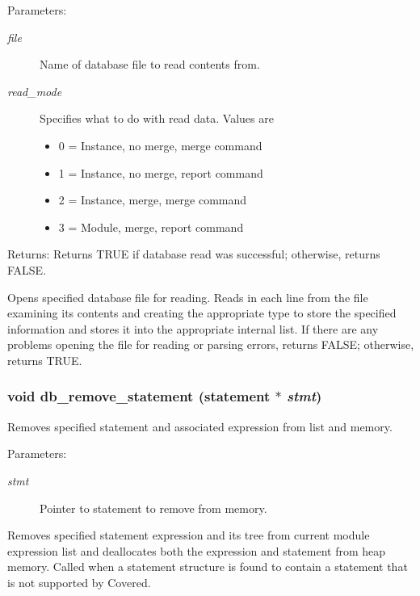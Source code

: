 \begin{Desc}
\item[Parameters:]
\begin{description}
\item[{\em file}]Name of database file to read contents from. \item[{\em read\_\-mode}]Specifies what to do with read data. Values are\begin{itemize}
\item 0 = Instance, no merge, merge command\item 1 = Instance, no merge, report command\item 2 = Instance, merge, merge command\item 3 = Module, merge, report command\end{itemize}
\end{description}
\end{Desc}
\begin{Desc}
\item[Returns:]Returns TRUE if database read was successful; otherwise, returns FALSE.\end{Desc}
Opens specified database file for reading. Reads in each line from the file examining its contents and creating the appropriate type to store the specified information and stores it into the appropriate internal list. If there are any problems opening the file for reading or parsing errors, returns FALSE; otherwise, returns TRUE. 
\subsubsection{\setlength{\rightskip}{0pt plus 5cm}void db\_\-remove\_\-statement ({\bf statement} $\ast$ {\em stmt})}\label{db_8h_a15}


Removes specified statement and associated expression from list and memory. 

\begin{Desc}
\item[Parameters:]
\begin{description}
\item[{\em stmt}]Pointer to statement to remove from memory.\end{description}
\end{Desc}
Removes specified statement expression and its tree from current module expression list and deallocates both the expression and statement from heap memory. Called when a statement structure is found to contain a statement that is not supported by Covered. 
